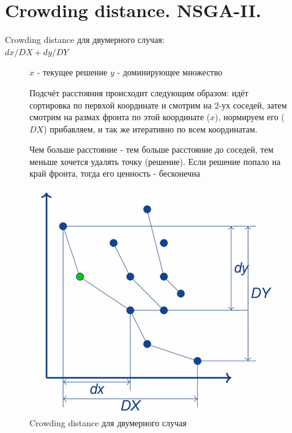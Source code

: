 \section{Crowding distance. NSGA-II.}
Crowding distance для двумерного случая:\\
$dx/DX +dy/DY$
\begin{figure}[!ht]
$x$ - текущее решение
$y$ - доминирующее множество 

Подсчёт расстояния происходит следующим образом: идёт сортировка по первхой координате и смотрим на 2-ух соседей, затем смотрим на размах фронта по этой координате ($x$), нормируем его ($DX$) прибавляем, и так же итеративно по всем координатам.

Чем больше расстояние - тем больше расстояние до соседей, тем меньше хочется удалять точку (решение). Если решение попало на край фронта, тогда его ценность - бесконечна
\begin{center}
    \includegraphics[width=0.8\linewidth]{images/Crowding_distance.PNG}
    \caption{Crowding distance для двумерного случая}
    \label{fig:mpr}
    
\end{center}
\end{figure}

